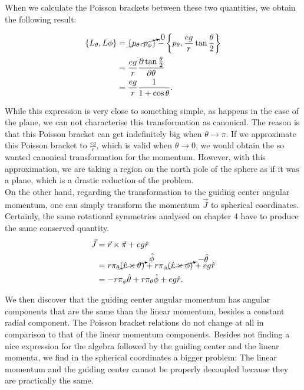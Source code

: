 When we calculate the Poisson brackets between these two quantities, we obtain the following result:

\begin{align*}
\left\lbrace L_\theta, L\phi \right\rbrace &= \cancelto{0}{\left\lbrace p_\theta, p_\phi \right\rbrace}-\left\lbrace p_\theta, \frac{eg}{r}\tan{\frac{\theta}{2}} \right\rbrace\\
&= \frac{eg}{r}\frac{\partial \tan{\frac{\theta}{2}} }{\partial \theta}\\
&=  \frac{eg}{r} \frac{1}{1+\cos{\theta}}.
\end{align*}

While this expression is very close to something simple, as happens in the case of the plane, we can not characterise this transformation as canonical. The reason is that this Poisson bracket can get indefinitely big when $\theta \to \pi$. If we approximate this Poisson bracket to $\frac{eg}{r}$, which is valid when $\theta \to 0$, we would obtain the so wanted canonical transformation for the momentum. However, with this approximation, we are taking a region on the north pole of the sphere as if it was a plane, which is a drastic reduction of the problem.\\

On the other hand, regarding the transformation to the guiding center angular momentum, one can simply transform the momentum $\vec{J}$ to spherical coordinates. Certainly, the same rotational symmetries analysed on chapter 4 have to produce the same conserved quantity.\\

\begin{align*}
\vec{J} &= \vec{r}\times\vec{\pi} + eg\hat{r}\\
&= r\pi_\theta \cancelto{\hat{\phi}}{(\hat{r}\times \theta)} + r\pi_\phi \cancelto{-\hat{\theta}}{(\hat{r}\times \phi)} + eg\hat{r}\\
&= -r\pi_\phi \hat{\theta} + r\pi_\theta \hat{\phi} + eg\hat{r}.
\end{align*}

We then discover that the guiding center angular momentum has angular components that are the same than the linear momentum, besides a constant radial component. The Poisson bracket relations do not change at all in comparison to that of the linear momentum components. Besides not finding a nice expression for the algebra followed by the guiding center and the linear momenta, we find in the spherical coordinates a bigger problem: The linear momentum and the guiding center cannot be properly decoupled because they are practically the same.\\

